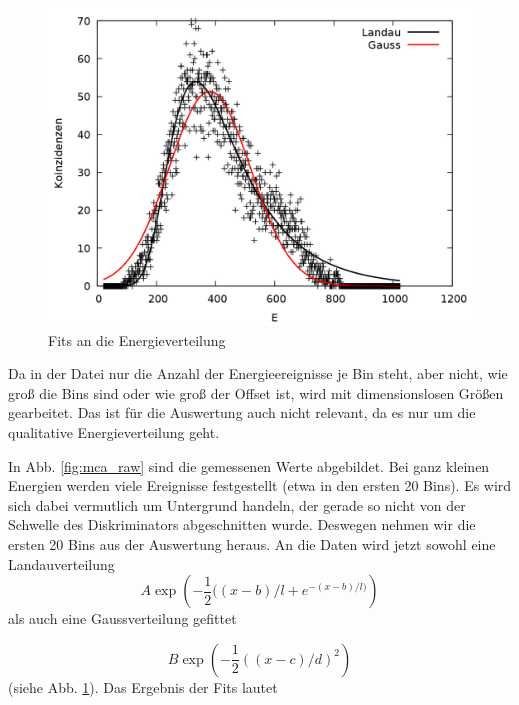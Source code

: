 \begin{figure}
\centering
\includegraphics[width=0.75\linewidth]{data/friedrich/mca.png}
\caption{Fits an die Energieverteilung}
\label{fig:mca}
\end{figure}

Da in der Datei nur die Anzahl der Energieereignisse je Bin steht, aber nicht, wie groß die Bins sind oder wie groß der Offset ist, wird mit dimensionslosen Größen gearbeitet. Das ist für die Auswertung auch nicht relevant, da es nur um die qualitative Energieverteilung geht.  

In Abb. \ref{fig:mca_raw} sind die gemessenen Werte abgebildet. Bei ganz kleinen Energien werden viele Ereignisse festgestellt (etwa in den ersten 20 Bins). Es wird sich dabei vermutlich um Untergrund handeln, der gerade so nicht von der Schwelle des Diskriminators abgeschnitten wurde. Deswegen nehmen wir die ersten 20 Bins aus der Auswertung heraus. An die Daten wird jetzt sowohl eine Landauverteilung
\[A\exp{\left(-\frac{1}{2}((x-b)/l + e^{-(x-b)/l)}\right)}\] als auch eine Gaussverteilung gefittet

\[B\exp{\left(-\frac{1}{2}((x-c)/d)^2 \right)}\]
 (siehe Abb. \ref{fig:mca}). Das Ergebnis der Fits lautet